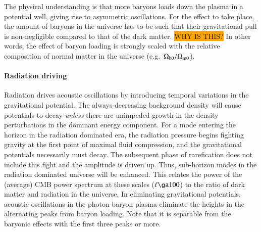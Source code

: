     The physical understanding is that more baryons loads down the plasma in a potential well, giving rise to asymmetric oscillations. For the effect to take place, the amount of baryons in the universe has to be such that their gravitational pull is non-negligible compared to that of the dark matter. \colorbox{orange}{WHY IS THIS?} In other words, the effect of baryon loading is strongly scaled with the relative composition of normal matter in the universe (e.g.~$\Omega_\mathrm{b0}/\Omega_{\mathrm{m}0}$). 
    
    \paragraph{Radiation driving} 
    Radiation drives acoustic oscillations by introducing temporal variations in the gravitational potential. The always-decreasing background density will cause potentials to decay \emph{unless} there are unimpeded growth in the density perturbations in the dominant energy component. For a mode entering the horizon in the radiation dominated era, the radiation pressure begins fighting gravity at the first point of maximal fluid compression, and the gravitational potentials necessarily must decay. The subsequent phase of rarefication does not include this fight and the amplitude is driven up. Thus, sub-horizon modes in the radiation dominated universe will be enhanced. This relates the power of the (average) CMB power spectrum at these scales ($\ell \ga 100$) to the ratio of dark matter and radiation in the universe. In eliminating gravitational potentials, acoustic oscillations in the photon-baryon plasma eliminate the heights in the alternating peaks from baryon loading. Note that it is separable from the baryonic effects with the first three peaks or more.





